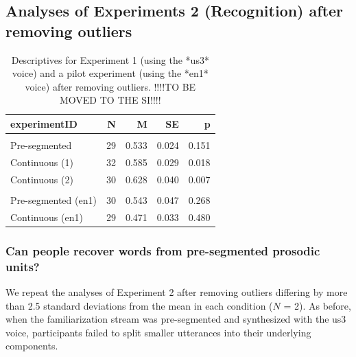\documentclass[
]{article}
\begin{document}
\clearpage

\hypertarget{analyses-of-experiments-2-recognition-after-removing-outliers}{%
\subsection{Analyses of Experiments 2 (Recognition) after removing
outliers}\label{analyses-of-experiments-2-recognition-after-removing-outliers}}

\begin{table}

\caption{\label{tab:stats-london-descriptives-no-outliers}Descriptives for Experiment 1 (using the *us3* voice) and a pilot experiment (using the *en1* voice) after removing outliers. !!!!TO BE MOVED TO THE SI!!!!}
\centering
\begin{tabular}[t]{lrrrr}
\toprule
experimentID & N & M & SE & p\\
\midrule
\addlinespace[0.3em]
\multicolumn{5}{l}{\textbf{us3}}\\
\hspace{1em}Pre-segmented & 29 & 0.533 & 0.024 & 0.151\\
\hspace{1em}Continuous (1) & 32 & 0.585 & 0.029 & 0.018\\
\hspace{1em}Continuous (2) & 30 & 0.628 & 0.040 & 0.007\\
\addlinespace[0.3em]
\multicolumn{5}{l}{\textbf{en1}}\\
\hspace{1em}Pre-segmented (en1) & 30 & 0.543 & 0.047 & 0.268\\
\hspace{1em}Continuous (en1) & 29 & 0.471 & 0.033 & 0.480\\
\bottomrule
\end{tabular}
\end{table}

\hypertarget{can-people-recover-words-from-pre-segmented-prosodic-units-1}{%
\subsubsection{Can people recover words from pre-segmented prosodic
units?}\label{can-people-recover-words-from-pre-segmented-prosodic-units-1}}

We repeat the analyses of Experiment 2 after removing outliers differing
by more than 2.5 standard deviations from the mean in each condition
(\(N\) = 2). As before, when the familiarization stream was
pre-segmented and synthesized with the us3 voice, participants failed to
split smaller utterances into their underlying components.
\end{document}
